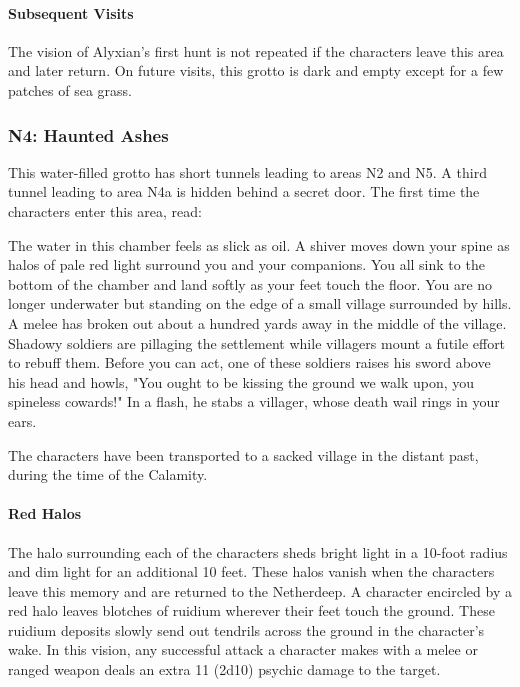 \documentclass[10pt,a4,twoside,twocolumn,openany,nodeprecatedcode]{dndbook}
\begin{document}
\paragraph{Subsequent Visits}
The vision of Alyxian's first hunt is not repeated if the characters leave this area and later return. On future visits, this grotto is dark and empty except for a few patches of sea grass.
\subsubsection{N4: Haunted Ashes}
This water-filled grotto has short tunnels leading to areas N2 and N5. A third tunnel leading to area N4a is hidden behind a secret door.
The first time the characters enter this area, read:
\begin{DndReadAloud}{}
The water in this chamber feels as slick as oil. A shiver moves down your spine as halos of pale red light surround you and your companions. You all sink to the bottom of the chamber and land softly as your feet touch the floor.
You are no longer underwater but standing on the edge of a small village surrounded by hills. A melee has broken out about a hundred yards away in the middle of the village. Shadowy soldiers are pillaging the settlement while villagers mount a futile effort to rebuff them. Before you can act, one of these soldiers raises his sword above his head and howls, "You ought to be kissing the ground we walk upon, you spineless cowards!" In a flash, he stabs a villager, whose death wail rings in your ears.
\end{DndReadAloud}

The characters have been transported to a sacked village in the distant past, during the time of the Calamity.
\paragraph{Red Halos}
The halo surrounding each of the characters sheds bright light in a 10-foot radius and dim light for an additional 10 feet. These halos vanish when the characters leave this memory and are returned to the Netherdeep.
A character encircled by a red halo leaves blotches of ruidium wherever their feet touch the ground. These ruidium deposits slowly send out tendrils across the ground in the character's wake. In this vision, any successful attack a character makes with a melee or ranged weapon deals an extra 11 (2d10) psychic damage to the target.
\end{document}
